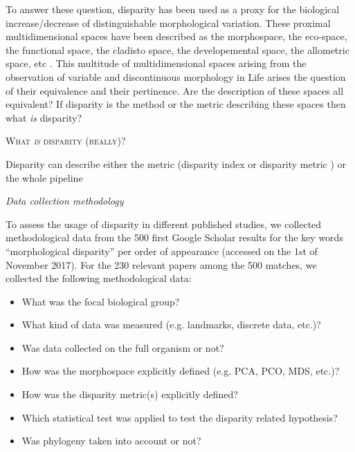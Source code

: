 \documentclass[12pt,letterpaper]{article}
\renewcommand{\section}[1]{%
\bigskip
\begin{center}
\begin{Large}
\normalfont\scshape #1
\medskip
\end{Large}
\end{center}}
\renewcommand{\subsection}[1]{%
\bigskip
\begin{center}
\begin{large}
\normalfont\itshape #1
\end{large}
\end{center}}
\begin{document}
To answer these question, disparity has been used as a proxy for the biological increase/decrease of distinguishable morphological variation.
These proximal multidimensional spaces have been described as the morphospace, the eco-space, the functional space, the cladisto space, the developemental space, the allometric space, etc \citep[see][and references therein]{Hopkins2017}.
This multitude of multidimensional spaces arising from the observation of variable and discontinuous morphology in Life arises the question of their equivalence and their pertinence.
Are the description of these spaces all equivalent?
If disparity is the method or the metric describing these spaces then what \textit{is} disparity?

\section{What \textit{is} disparity (really)?}

Disparity can describe either the metric (disparity index \citep{Hopkins2017} or disparity metric \citep{Wills2001}) or the whole pipeline \citep{Claddis,zelditch2012geometric}

\subsection{Data collection methodology}
To assess the usage of disparity in different published studies, we collected methodological data from the 500 first Google Scholar results for the key words ``morphological disparity'' per order of appearance (accessed on the 1st of November 2017).
For the 230 relevant papers among the 500 matches, we collected the following methodological data:

\begin{itemize}
    \item What was the focal biological group?
    \item What kind of data was measured (e.g. landmarks, discrete data, etc.)?
    \item Was data collected on the full organism or not?
    \item How was the morphospace explicitly defined (e.g. PCA, PCO, MDS, etc.)?
    \item How was the disparity metric(s) explicitly defined?
    \item Which statistical test was applied to test the disparity related hypothesis?
    \item Was phylogeny taken into account or not?
\end{itemize}
\end{document}
